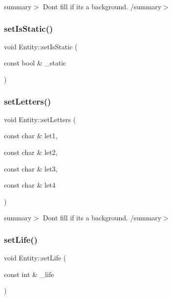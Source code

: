summary$>$ Don\textquotesingle{}t fill if it\textquotesingle{}s a background. /summary$>$ \mbox{\label{class_entity_a244da4e0d4e810ce06ceac77c92364ce}} 
\subsubsection{\texorpdfstring{set\+Is\+Static()}{setIsStatic()}}
{\footnotesize\ttfamily void Entity\+::set\+Is\+Static (\begin{DoxyParamCaption}\item[{const bool \&}]{\+\_\+static }\end{DoxyParamCaption})\hspace{0.3cm}{\ttfamily [inline]}}

\mbox{\label{class_entity_a22f43d574204ed951d0af3de0296b636}} 
\subsubsection{\texorpdfstring{set\+Letters()}{setLetters()}}
{\footnotesize\ttfamily void Entity\+::set\+Letters (\begin{DoxyParamCaption}\item[{const char \&}]{let1,  }\item[{const char \&}]{let2,  }\item[{const char \&}]{let3,  }\item[{const char \&}]{let4 }\end{DoxyParamCaption})}

summary$>$ Don\textquotesingle{}t fill if it\textquotesingle{}s a background. /summary$>$ \mbox{\label{class_entity_a6ac1fd9eaff1cb28be726cf960f0d1ee}} 
\subsubsection{\texorpdfstring{set\+Life()}{setLife()}}
{\footnotesize\ttfamily void Entity\+::set\+Life (\begin{DoxyParamCaption}\item[{const int \&}]{\+\_\+life }\end{DoxyParamCaption})\hspace{0.3cm}{\ttfamily [inline]}}

